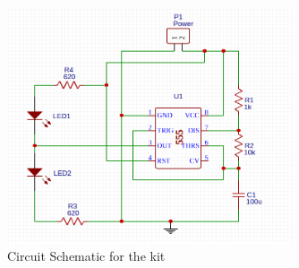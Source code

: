 \documentclass{article}
\begin{document}
    
\begin{figure}[H]
\caption{ Circuit Schematic for the kit }
\label{fig:img/circuit.png}
\centering
\includegraphics[width=0.75\textwidth]{img/circuit.png}
\end{figure}
\end{document}
